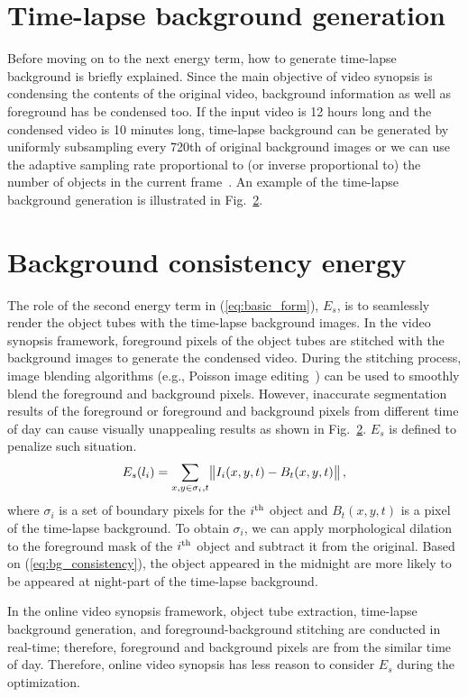 \documentclass[11pt]{hyu_thesis}
\begin{document}
\section{Time-lapse background generation}
Before moving on to the next energy term, how to generate time-lapse background is briefly explained. Since the main objective of video synopsis is condensing the contents of the original video, background information as well as foreground has be condensed too. If the input video is 12 hours long and the condensed video is 10 minutes long, time-lapse background can be generated by uniformly subsampling every 720th of original background images or we can use the adaptive sampling rate proportional to (or inverse proportional to) the number of objects in the current frame~\cite{}. An example of the time-lapse background generation is illustrated in Fig.~\ref{}.

\section{Background consistency energy}
The role of the second energy term in (\ref{eq:basic_form}), $E_s$, is to seamlessly render the object tubes with the time-lapse background images. In the video synopsis framework, foreground pixels of the object tubes are stitched with the background images to generate the condensed video. During the stitching process, image blending algorithms (e.g., Poisson image editing~\cite{Perez2003}) can be used to smoothly blend the foreground and background pixels. However, inaccurate segmentation results of the foreground or foreground and background pixels from different time of day can cause visually unappealing results as shown in Fig.~\ref{}. $E_s$ is defined to penalize such situation.
\begin{equation}
\label{eq:bg_consistency}
E_s(l_i)=\sum_{x,y \in \sigma_i,t}\norm{I_i(x,y,t)-B_t(x,y,t)},
\end{equation}
where $\sigma_i$ is a set of boundary pixels for the $i^{\rm{th}}$ object and $B_t(x,y,t)$ is a pixel of the time-lapse background. To obtain $\sigma_i$, we can apply morphological dilation to the foreground mask of the $i^{\rm{th}}$ object and subtract it from the original. Based on (\ref{eq:bg_consistency}), the object appeared in the midnight are more likely to be appeared at night-part of the time-lapse background.

In the online video synopsis framework, object tube extraction, time-lapse background generation, and foreground-background stitching are conducted in real-time; therefore, foreground and background pixels are from the similar time of day. Therefore, online video synopsis has less reason to consider $E_s$ during the optimization.
\end{document}
